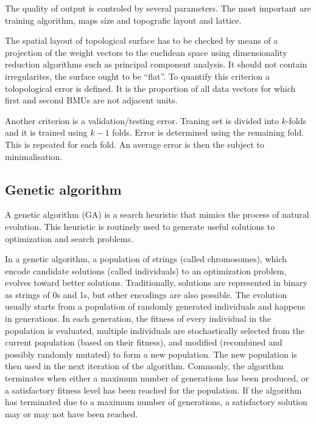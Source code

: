 \documentclass[a4paper]{IEEEtran}
\begin{document}
The quality of output is controled by several parameters. The most important are 
training algorithm, maps size and topografic layout and lattice.

The spatial layout of topological surface has to be checked by means of a projection
of the weight vectors to the euclidean space using dimensionality reduction algorithms
such as principal component analysis.
It should not contain irregularites, the surface ought to be ``flat''.
To quantify this criterion a tolopological error is defined. It is the proportion 
of all data vectors for which first and second BMUs are not adjacent units.

Another criterion is a validation/testing error. Traning set is divided into $ k $-folds
and it is trained using $ k-1 $ folds. Error is determined using the remaining fold.
This is repeated for each fold. An average error is then the subject to minimalisation.

\subsection{Genetic algorithm}
A genetic algorithm (GA) is a search heuristic that mimics the 
process of natural evolution. This heuristic is routinely used to 
generate useful solutions to optimization and search problems.

In a genetic algorithm, a population of strings (called chromosomes), 
which encode candidate solutions (called individuals) to an optimization problem,
evolves toward better solutions.
Traditionally, solutions are represented in binary as strings of 0s and 1s, 
but other encodings are also possible. 
The evolution usually starts from a population of randomly generated individuals 
and happens in generations.
In each generation, the fitness of every individual in the population is evaluated,
multiple individuals are stochastically selected from the current population 
(based on their fitness), and modified (recombined and possibly randomly mutated) 
to form a new population. The new population is then used in the next 
iteration of the algorithm. 
Commonly, the algorithm terminates when either a maximum number of generations 
has been produced, or a satisfactory fitness level has been reached 
for the population. 
If the algorithm has terminated due to a maximum number of generations, 
a satisfactory solution may or may not have been reached.
\end{document}
